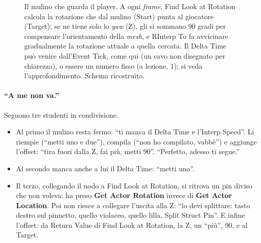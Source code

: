 \begin{figure}[htbp]
\caption{Il mulino che guarda il player. A ogni \emph{frame}, Find Look at Rotation
calcola la rotazione che dal mulino (Start) punta al giocatore (Target); se ne tiene
solo lo \emph{yaw} (Z), gli si sommano 90 gradi per compensare l'orientamento della
\emph{mesh}, e RInterp To fa avvicinare gradualmente la rotazione attuale a quella
cercata. Il Delta Time può venire dall'Event Tick, come qui (un cavo non disegnato per
chiarezza), o essere un numero fisso (a lezione, 1); si veda l'approfondimento. Schema ricostruito.}
\label{ue4:fig:lookat}
\end{figure}

\paragraph{``A me non va.''} Seguono tre studenti in condivisione.
\begin{itemize}
  \item Al primo il mulino resta fermo: ``ti manca il Delta Time e
        l'Interp Speed''. Li riempie (``metti uno e due''), compila (``non ho
        compilato, vabbè'') e aggiunge l'offset: ``tira fuori dalla Z, fai più, metti
        90''. ``Perfetto, adesso ti segue.''
  \item Al secondo manca anche a lui il Delta Time: ``metti uno''.
  \item Il terzo, collegando il nodo a Find Look at Rotation, si ritrova un pin
        diviso che non voleva: ha preso \textbf{Get Actor Rotation} invece di
        \textbf{Get Actor Location}. Poi non riesce a collegare l'uscita alla Z:
        ``lo devi splittare: tasto destro sul pinnetto, quello violaceo, quello
        lilla, Split Struct Pin''. E infine l'offset: da Return Value di Find Look at
        Rotation, la Z, un ``più'', 90, e al Target.
\end{itemize}

